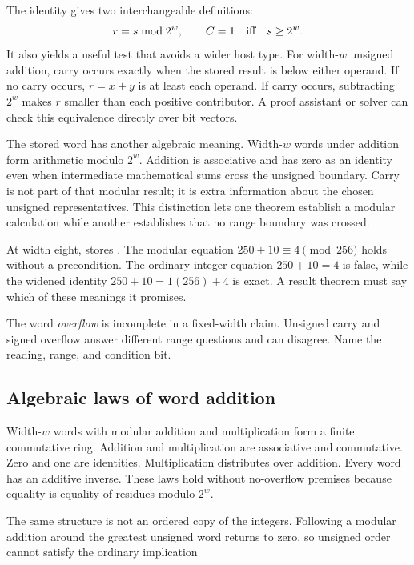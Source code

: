 The identity gives two interchangeable definitions:
\[
  r=s\bmod 2^w,
  \qquad
  C=1\quad\hbox{iff}\quad s\geq 2^w.
\]
It also yields a useful test that avoids a wider host type. For width-\(w\)
unsigned addition, carry occurs exactly when the stored result is below either
operand. If no carry occurs, \(r=x+y\) is at least each operand. If carry
occurs, subtracting \(2^w\) makes \(r\) smaller than each positive
contributor. A proof assistant or solver can check this equivalence directly
over bit vectors.

The stored word has another algebraic meaning. Width-\(w\) words under
addition form arithmetic modulo \(2^w\). Addition is associative and has
zero as an identity even when intermediate mathematical sums cross the
unsigned boundary. Carry is not part of that modular result; it is extra
information about the chosen unsigned representatives. This distinction lets
one theorem establish a modular calculation while another establishes that no
range boundary was crossed.

\begin{example}[title={One result, two claims}]
At width eight,  stores . The modular equation
\(250+10\equiv4\pmod{256}\) holds without a precondition. The ordinary
integer equation \(250+10=4\) is false, while the widened identity
\(250+10=1(256)+4\) is exact. A result theorem must say which of these
meanings it promises.
\end{example}

\begin{warning}[title={Say which overflow you mean}]
The word \emph{overflow} is incomplete in a fixed-width claim. Unsigned carry
and signed overflow answer different range questions and can disagree. Name
the reading, range, and condition bit.
\end{warning}

\subsection{Algebraic laws of word addition}

Width-\(w\) words with modular addition and multiplication form a finite
commutative ring. Addition and multiplication are associative and commutative.
Zero and one are identities. Multiplication distributes over addition. Every
word has an additive inverse. These laws hold without no-overflow premises
because equality is equality of residues modulo \(2^w\).

The same structure is not an ordered copy of the integers. Following a modular
addition around the greatest unsigned word returns to zero, so unsigned order
cannot satisfy the ordinary implication

